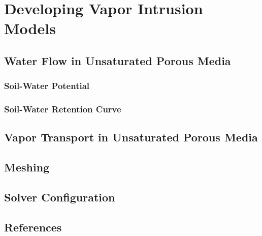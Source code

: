 \documentclass[../thesis.tex]{subfiles}
\begin{document}
\chapter{Developing Vapor Intrusion Models}






\section{Water Flow in Unsaturated Porous Media}

\subsection{Soil-Water Potential}

\subsection{Soil-Water Retention Curve}


\section{Vapor Transport in Unsaturated Porous Media}






\section{Meshing}

\section{Solver Configuration}


\section{References}
\end{document}
